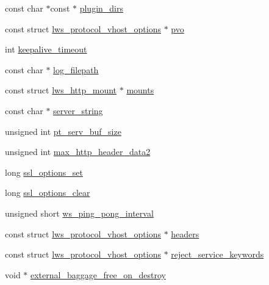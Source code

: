 \begin{DoxyCompactItemize}
const char $\ast$const  $\ast$ \hyperlink{structlws__context__creation__info_acf320db7f27298ac7e80bded9316ba12}{plugin\+\_\+dirs}
\item 
const struct \hyperlink{structlws__protocol__vhost__options}{lws\+\_\+protocol\+\_\+vhost\+\_\+options} $\ast$ \hyperlink{structlws__context__creation__info_a05b00b2b00fa958ad93285cacd668732}{pvo}
\item 
int \hyperlink{structlws__context__creation__info_a81697c6b763b5ef3ee52862bc70b07d6}{keepalive\+\_\+timeout}
\item 
const char $\ast$ \hyperlink{structlws__context__creation__info_a30a445e8e76edab8f54c0b0aa026c28c}{log\+\_\+filepath}
\item 
const struct \hyperlink{structlws__http__mount}{lws\+\_\+http\+\_\+mount} $\ast$ \hyperlink{structlws__context__creation__info_a29d0df372d4609de6de6902f4017dbc3}{mounts}
\item 
const char $\ast$ \hyperlink{structlws__context__creation__info_a7c4179745f15085a70e36b633997b94b}{server\+\_\+string}
\item 
unsigned int \hyperlink{structlws__context__creation__info_a57f88c0745adbd1d6b9b619b8de30209}{pt\+\_\+serv\+\_\+buf\+\_\+size}
\item 
unsigned int \hyperlink{structlws__context__creation__info_aa8d9e85e137f35fb006f2e4a53f0887a}{max\+\_\+http\+\_\+header\+\_\+data2}
\item 
long \hyperlink{structlws__context__creation__info_a704940261951ced6b5d8191bd8b9bb2d}{ssl\+\_\+options\+\_\+set}
\item 
long \hyperlink{structlws__context__creation__info_adb0bc0b28cd7d90ab306723d8ffa96fa}{ssl\+\_\+options\+\_\+clear}
\item 
unsigned short \hyperlink{structlws__context__creation__info_a33a1a25a7df3793f59047e20dd580078}{ws\+\_\+ping\+\_\+pong\+\_\+interval}
\item 
const struct \hyperlink{structlws__protocol__vhost__options}{lws\+\_\+protocol\+\_\+vhost\+\_\+options} $\ast$ \hyperlink{structlws__context__creation__info_af8b9d4df584baf136bdcb36e5af6dfbf}{headers}
\item 
const struct \hyperlink{structlws__protocol__vhost__options}{lws\+\_\+protocol\+\_\+vhost\+\_\+options} $\ast$ \hyperlink{structlws__context__creation__info_a64f9df91de3153e7dce270e0ef1abce3}{reject\+\_\+service\+\_\+keywords}
\item 
void $\ast$ \hyperlink{structlws__context__creation__info_ad050e82073957b8a89e24ddb84aaba14}{external\+\_\+baggage\+\_\+free\+\_\+on\+\_\+destroy}

\end{DoxyCompactItemize}
